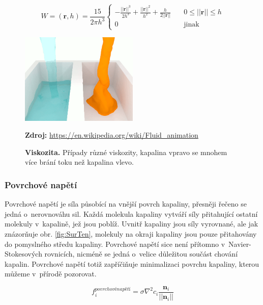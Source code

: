 \begin{equation}
    W = (\mathbf{r}, h) = \frac{15}{2 \pi h^3} 
    \begin{cases}
      -\frac{||\mathbf{r}||^3}{2h^3} + \frac{||\mathbf{r}||^2}{h^2} + \frac{h}{2||\mathbf{r}||} & \quad 0 \leq ||\mathbf{r}|| \leq h \\
      0 & \quad \text{jinak}
    \end{cases}
    \label{eq:pressureKernel}
\end{equation}

\begin{figure}[hbt]
	\centering
	\captionsetup{justification=centering}
	\includegraphics[width=0.5\textwidth]{obrazky-figures/viskozita.PNG}
	\caption{\textbf{Viskozita.} Případy různé viskozity, kapalina vpravo se mnohem více brání toku než kapalina vlevo.}
	\textbf{Zdroj: } \url{https://en.wikipedia.org/wiki/Fluid_animation}
	\label{fig:Vics}
\end{figure}

\subsubsection{Povrchové napětí}
Povrchové napětí je síla působící na vnější povrch kapaliny, přesněji řečeno se jedná o~nerovnováhu sil. Každá molekula kapaliny vytváří síly přitahující ostatní molekuly v~kapalině, jež jsou poblíž. Uvnitř kapaliny jsou síly vyrovnané, ale jak znázorňuje obr. \ref{fig:SurTen}, molekuly na okraji kapaliny jsou pouze přitahovány do pomyslného středu kapaliny. Povrchové napětí sice není přítomno v~Navier-Stokesových rovnicích, nicméně se jedná o~velice důležitou součást chování kapalin. Povrchové napětí totiž zapříčiňuje minimalizaci povrchu kapaliny, kterou můžeme v~přírodě pozorovat. \cite{KelagerSPH}

\begin{equation}
    f_i^{povrchové napětí} = \sigma \nabla^2 c_i \frac{\mathbf{n}_i}{||\mathbf{n}_i||}
    \label{eq:SurfTen}
\end{equation}


